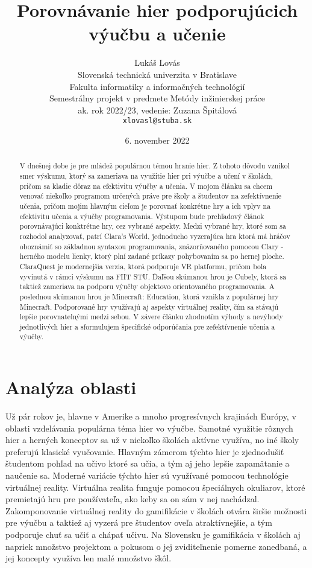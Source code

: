 \documentclass[10pt,oneside,slovak,a4paper]{article}
\title{Porovnávanie hier podporujúcich výučbu a učenie}
\author{Lukáš Lovás\\[2pt]
	{\small Slovenská technická univerzita v Bratislave}\\
	{\small Fakulta informatiky a informačných technológií}\\
	{\small Semestrálny projekt v predmete Metódy inžinierskej práce}\\
	{\small  ak. rok 2022/23, vedenie: Zuzana Špitálová}\\
	{\small \texttt{xlovasl@stuba.sk}}\\
	}
\date{\small 6. november 2022} %
\begin{document}
\maketitle

\begin{abstract}
V dnešnej dobe je pre mládež populárnou témou hranie hier. Z tohoto dôvodu vznikol smer výskumu, ktorý sa zameriava na využitie hier pri výučbe a učení v školách, pričom sa kladie dôraz na efektivitu výučby a učenia. V mojom článku sa chcem venovať niekoľko programom určených práve pre školy a študentov na zefektívnenie učenia, pričom mojim hlavným cieľom je porovnať konkrétne hry a ich vplyv na efektivitu učenia a výučby programovania. Výstupom bude prehľadový článok porovnávajúci konktrétne hry, cez vybrané aspekty. Medzi vybrané hry, ktoré som sa rozhodol analyzovať, patrí Clara's World\cite{ClarasWorld}, jednoducho vyzerajúca hra ktorá má hráčov oboznámiť so základnou syntaxou programovania, znázorňovaného pomocou Clary - herného modelu lienky, ktorý plní zadané príkazy pohybovaním sa po hernej ploche. ClaraQuest\cite{ClaraQuest} je modernejšia verzia, ktorá podporuje VR platformu, pričom bola vyvinutá v rámci výskumu na FIIT STU. Ďaľšou skúmanou hrou je Cubely\cite{Cubely}, ktorá sa taktiež zameriava na podporu výučby objektovo orientovaného programovania. A poslednou skúmanou hrou je Minecraft: Education\cite{MinecraftEd}, ktorá vznikla z populárnej hry Minecraft. Podporované hry využívajú aj aspekty virtuálnej reality, čím sa stávajú lepšie porovnatelnými medzi sebou. V závere článku zhodnotím výhody a nevýhody jednotlivých hier a sformulujem špecifické odporúčania pre zefektívnenie učenia a výučby. 

\end{abstract}




\section{Analýza oblasti}
Už pár rokov je, hlavne v Amerike a mnoho progresívnych krajinách Európy, v oblasti vzdelávania populárna téma hier vo výučbe. Samotné využitie rôznych hier a herných konceptov sa už v niekoľko školách aktívne využíva, no iné školy preferujú klasické vyučovanie. Hlavným zámerom týchto hier je zjednodušiť študentom pohľad na učivo ktoré sa učia, a tým aj jeho lepšie zapamätanie a naučenie sa. Moderné variácie týchto hier sú využívané pomocou technológie virtuálnej reality. Virtuálna realita funguje pomocou špeciálnych okuliarov, ktoré premietajú hru pre používateľa, ako keby sa on sám v nej nachádzal. Zakomponovanie virtuálnej reality do gamifikácie v školách otvára širšie možnosti pre výučbu a taktiež aj vyzerá pre študentov oveľa atraktívnejšie, a tým podporuje chuť sa učiť a chápať učivu. Na Slovensku je gamifikácia v školách aj napriek množstvo projektom a pokusom o jej zviditeľnenie pomerne zanedbaná, a jej koncepty využíva len malé množstvo škôl.
\end{document}
